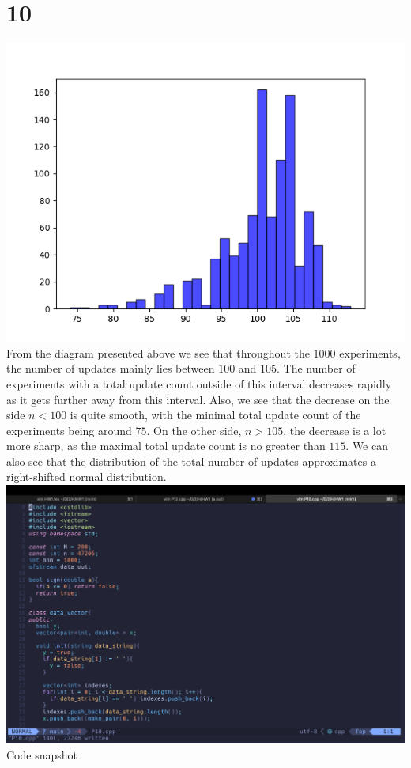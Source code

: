 \documentclass[11pt]{article}
\theoremstyle{definition}
\begin{document}
\section*{10}
\includegraphics{P10_figure.png} \\
From the diagram presented above we see that throughout the $1000$ experiments, the number of updates mainly lies between $100$ and $105$. The number of experiments with a total update count outside of this interval decreases rapidly as it gets further away from this interval. Also, we see that the decrease on the side $n < 100$ is quite smooth, with the minimal total update count of the experiments being around $75$. On the other side, $n > 105$, the decrease is a lot more sharp, as the maximal total update count is no greater than $115$. We can also see that the distribution of the total number of updates approximates a right-shifted normal distribution. \\
\includegraphics[width = \textwidth]{P10_code.png}\\
Code snapshot\\
\newpage
\end{document}
